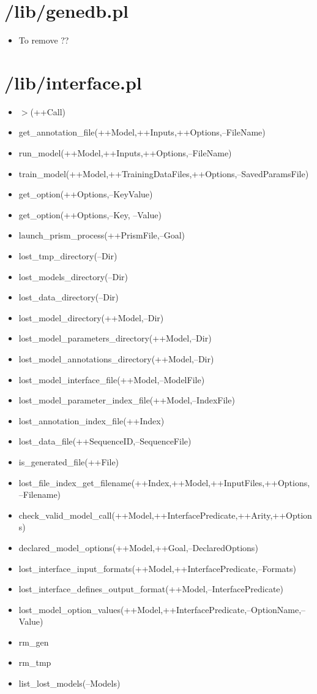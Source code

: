 \section{/lib/genedb.pl}
%
\begin{itemize}
\item To remove ??
\end{itemize}

\section{/lib/interface.pl}
%
\begin{itemize}
\item $>$(++Call)
\item get\_annotation\_file(++Model,++Inputs,++Options,--FileName)
\item run\_model(++Model,++Inputs,++Options,--FileName)
\item train\_model(++Model,++TrainingDataFiles,++Options,--SavedParamsFile)
\item get\_option(++Options,--KeyValue)
\item get\_option(++Options,--Key, --Value)
\item launch\_prism\_process(++PrismFile,--Goal)
\item lost\_tmp\_directory(--Dir)
\item lost\_models\_directory(--Dir)
\item lost\_data\_directory(--Dir)
\item lost\_model\_directory(++Model,--Dir)
\item lost\_model\_parameters\_directory(++Model,--Dir)
\item lost\_model\_annotations\_directory(++Model,--Dir) %
\item lost\_model\_interface\_file(++Model,--ModelFile)
\item lost\_model\_parameter\_index\_file(++Model,--IndexFile)
\item lost\_annotation\_index\_file(++Index)
\item lost\_data\_file(++SequenceID,--SequenceFile)
\item is\_generated\_file(++File)
\item lost\_file\_index\_get\_filename(++Index,++Model,++InputFiles,++Options,--Filename)
\item check\_valid\_model\_call(++Model,++InterfacePredicate,++Arity,++Options)
\item declared\_model\_options(++Model,++Goal,--DeclaredOptions)
\item lost\_interface\_input\_formats(++Model,++InterfacePredicate,--Formats)
\item lost\_interface\_defines\_output\_format(++Model,--InterfacePredicate)
\item lost\_model\_option\_values(++Model,++InterfacePredicate,--OptionName,--Value)  
\item rm\_gen
\item rm\_tmp
\item list\_lost\_models(--Models) 
\end{itemize}

